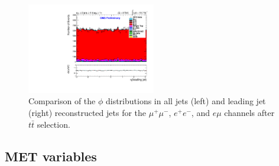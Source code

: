 \documentclass[oneside, a4paper, 11pt, ]{report}
\begin{document}
\begin{figure}
\includegraphics[width=0.5\textwidth]{Plots/ControlPlots/TTbarDiLeptonAnalysis/EMu/Jets/jet1_phi_splitTTbar_ratio.pdf}
\caption{Comparison of the $\phi$ distributions in all jets (left) and leading jet (right) reconstructed jets for the $\mu^{+}\mu^{-}$, $e^{+}e^{-}$, and $e\mu$ channels after $t\bar{t}$ selection.}
\label{fig-jets}
\end{figure}

\subsection{MET variables}
\end{document}
